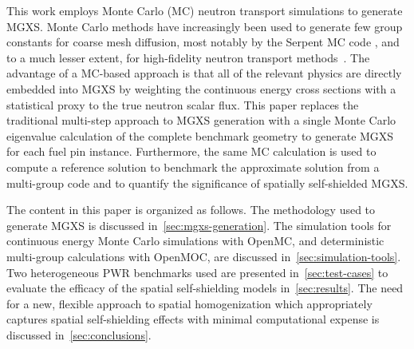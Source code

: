 This work employs Monte Carlo (MC) neutron transport simulations to generate MGXS. Monte Carlo methods have increasingly been used to generate few group constants for coarse mesh diffusion, most notably by the Serpent MC code \citep{serpent2013manual}, and to a much lesser extent, for high-fidelity neutron transport methods~\citep{redmond1997multigroup, nelson2014improved, cai2014condensation, boyd2016thesis}. The advantage of a MC-based approach is that all of the relevant physics are directly embedded into MGXS by weighting the continuous energy cross sections with a statistical proxy to the true neutron scalar flux. This paper replaces the traditional multi-step approach to MGXS generation with a single Monte Carlo eigenvalue calculation of the complete benchmark geometry to generate MGXS for each fuel pin instance. Furthermore, the same MC calculation is used to compute a reference solution to benchmark the approximate solution from a multi-group code and to quantify the significance of spatially self-shielded MGXS.

The content in this paper is organized as follows. The methodology used to generate MGXS is discussed in~\autoref{sec:mgxs-generation}. The simulation tools for continuous energy Monte Carlo simulations with OpenMC, and deterministic multi-group calculations with OpenMOC, are discussed in~\autoref{sec:simulation-tools}. Two heterogeneous PWR benchmarks used are presented in~\autoref{sec:test-cases} to evaluate the efficacy of the spatial self-shielding models in~\autoref{sec:results}. The need for a new, flexible approach to spatial homogenization which appropriately captures spatial self-shielding effects with minimal computational expense is discussed in~\autoref{sec:conclusions}.